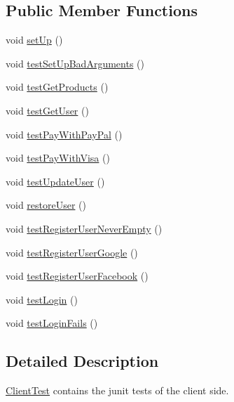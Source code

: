 \subsection*{Public Member Functions}
\begin{DoxyCompactItemize}
\item 
void \mbox{\hyperlink{class_s_p_q_1_1_client_test_abcdab9dbc12c8a65ebbfb96877e4d5a1}{set\+Up}} ()
\item 
void \mbox{\hyperlink{class_s_p_q_1_1_client_test_add97afff5978c2f1b8e950cc4942eda5}{test\+Set\+Up\+Bad\+Arguments}} ()
\item 
void \mbox{\hyperlink{class_s_p_q_1_1_client_test_ab83877066a3bb92e514ca496cb96cdbf}{test\+Get\+Products}} ()
\item 
void \mbox{\hyperlink{class_s_p_q_1_1_client_test_a611b894c9d3826db1d2104e2aae23267}{test\+Get\+User}} ()
\item 
void \mbox{\hyperlink{class_s_p_q_1_1_client_test_afe92931ed84ed471c853004681be4072}{test\+Pay\+With\+Pay\+Pal}} ()
\item 
void \mbox{\hyperlink{class_s_p_q_1_1_client_test_ae6f432ec2c9b37a231883ad94ffb624d}{test\+Pay\+With\+Visa}} ()
\item 
void \mbox{\hyperlink{class_s_p_q_1_1_client_test_ab6d14403cd66b3b0ab32f8022902588f}{test\+Update\+User}} ()
\item 
void \mbox{\hyperlink{class_s_p_q_1_1_client_test_acc91cf7e3927e95fc4515abeae043969}{restore\+User}} ()
\item 
void \mbox{\hyperlink{class_s_p_q_1_1_client_test_ae5a5c27b65ff1dea107d913ea609cb0c}{test\+Register\+User\+Never\+Empty}} ()
\item 
void \mbox{\hyperlink{class_s_p_q_1_1_client_test_a5f10079da4053b4e2c183b715c246bfa}{test\+Register\+User\+Google}} ()
\item 
void \mbox{\hyperlink{class_s_p_q_1_1_client_test_ae74ec6f1a9672b8dbffeaf89abe44bbd}{test\+Register\+User\+Facebook}} ()
\item 
void \mbox{\hyperlink{class_s_p_q_1_1_client_test_a88728d2e3535750655d518d73f81e22b}{test\+Login}} ()
\item 
void \mbox{\hyperlink{class_s_p_q_1_1_client_test_ac05d043ac92f1c1083d19eec58e5bbd9}{test\+Login\+Fails}} ()
\end{DoxyCompactItemize}


\subsection{Detailed Description}
\mbox{\hyperlink{class_s_p_q_1_1_client_test}{Client\+Test}} contains the junit tests of the client side. 

